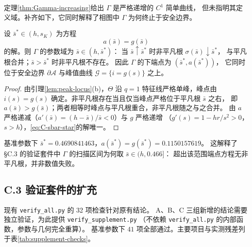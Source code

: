 定理\ref{thm:Gamma-increasing}给出 $\Gamma$ 是严格递增的 $C^1$ 简单曲线，
但未指明其定义域。补齐如下，它同时解释了相图中 $\Gamma$ 为何终止于安全边界。

\begin{proposition}
\label{prop:Gamma-endpoint}
设 $\bar s^*\in(h,s_K)$ 为方程
\begin{equation}
  a(\bar s)=g(\bar s)
  \label{eq:C-sbar-star}
\end{equation}
的解。则 $\Gamma$ 的参数域为 $\bar s\in(h,\bar s^*)$：
当 $\bar s\uparrow\bar s^*$ 时非平凡根 $\sigma(\bar s)\downarrow\bar s^*$，
与平凡根合并；$\bar s>\bar s^*$ 时非平凡根不存在。
因此 $\Gamma$ 的下端点为 $(\bar s^*,a(\bar s^*))$，
它同时位于安全边界 $\partial\mathcal{A}$ 与峰值曲线
$\mathcal{G}=\{i=g(s)\}$ 之上。
\end{proposition}

\begin{proof}
由引理\ref{lem:peak-locus}(b)，$\Theta$ 沿 $q=1$ 特征线严格单峰，峰点由
$i(s)=g(s)$ 确定。非平凡根存在当且仅当峰点严格位于平凡根 $\bar s$ 之右，
即 $a(\bar s)>g(\bar s)$；两者相等时峰点与平凡根重合，非平凡根随之与之合并。
由 $a$ 严格递减（$a'(\bar s)=(h-\bar s)/\bar s<0$）与 $g$ 严格递增
（$g'(s)=1-hr/s^2>0$，$s>h$），\eqref{eq:C-sbar-star}的解唯一。
\end{proof}

\begin{remark}
基准参数下 $\bar s^*=0.4690841463$，$a(\bar s^*)=g(\bar s^*)=0.1150157619$。
这解释了 \S C.3 的验证套件中 $\Gamma$ 的扫描区间为何取 $\bar s\in(h,0.466]$：
超出该范围端点方程无非平凡根，并非数值失败。
\end{remark}


\subsection*{C.3 验证套件的扩充}

现有 \texttt{verify\_all.py} 的 32 项检查针对原有结论。
A、B、C 三组新增的结论需要独立验证，为此提供 \texttt{verify\_supplement.py}
（不依赖 \texttt{verify\_all.py} 的内部函数，参数与几何完全重算）。
基准参数下 $41$ 项全部通过。主要项目与实测残差列于表\ref{tab:supplement-checks}。

